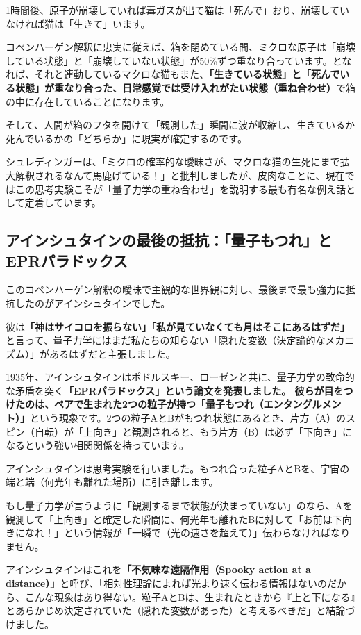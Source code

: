 1時間後、原子が崩壊していれば毒ガスが出て猫は「死んで」おり、崩壊していなければ猫は「生きて」います。

コペンハーゲン解釈に忠実に従えば、箱を閉めている間、ミクロな原子は「崩壊している状態」と「崩壊していない状態」が50\%ずつ重なり合っています。となれば、それと連動しているマクロな猫もまた、\textbf{「生きている状態」と「死んでいる状態」が重なり合った、日常感覚では受け入れがたい状態（重ね合わせ）}で箱の中に存在していることになります。

そして、人間が箱のフタを開けて「観測した」瞬間に波が収縮し、生きているか死んでいるかの「どちらか」に現実が確定するのです。

シュレディンガーは、「ミクロの確率的な曖昧さが、マクロな猫の生死にまで拡大解釈されるなんて馬鹿げている！」と批判しましたが、皮肉なことに、現在ではこの思考実験こそが「量子力学の重ね合わせ」を説明する最も有名な例え話として定着しています。

\subsection{アインシュタインの最後の抵抗：「量子もつれ」とEPRパラドックス}

このコペンハーゲン解釈の曖昧で主観的な世界観に対し、最後まで最も強力に抵抗したのがアインシュタインでした。

彼は\textbf{「神はサイコロを振らない」「私が見ていなくても月はそこにあるはずだ」}と言って、量子力学にはまだ私たちの知らない「隠れた変数（決定論的なメカニズム）」があるはずだと主張しました。

1935年、アインシュタインはポドルスキー、ローゼンと共に、量子力学の致命的な矛盾を突く\textbf{「EPRパラドックス」という論文を発表しました。 彼らが目をつけたのは、ペアで生まれた2つの粒子が持つ「量子もつれ（エンタングルメント）」}という現象です。2つの粒子AとBがもつれ状態にあるとき、片方（A）のスピン（自転）が「上向き」と観測されると、もう片方（B）は必ず「下向き」になるという強い相関関係を持っています。

アインシュタインは思考実験を行いました。もつれ合った粒子AとBを、宇宙の端と端（何光年も離れた場所）に引き離します。

もし量子力学が言うように「観測するまで状態が決まっていない」のなら、Aを観測して「上向き」と確定した瞬間に、何光年も離れたBに対して「お前は下向きになれ！」という情報が「一瞬で（光の速さを超えて）」伝わらなければなりません。

アインシュタインはこれを\textbf{「不気味な遠隔作用（Spooky action at a distance）」}と呼び、「相対性理論によれば光より速く伝わる情報はないのだから、こんな現象はあり得ない。粒子AとBは、生まれたときから『上と下になる』とあらかじめ決定されていた（隠れた変数があった）と考えるべきだ」と結論づけました。

